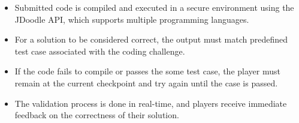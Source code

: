 \begin{itemize}
    \item Submitted code is compiled and executed in a secure environment using the JDoodle API, which supports multiple programming languages.
    \item For a solution to be considered correct, the output must match  predefined test case associated with the coding challenge.
    \item If the code fails to compile or passes the some test case, the player must remain at the current checkpoint and try again until the case is passed.
    \item The validation process is done in real-time, and players receive immediate feedback on the correctness of their solution.
\end{itemize}

\newpage
